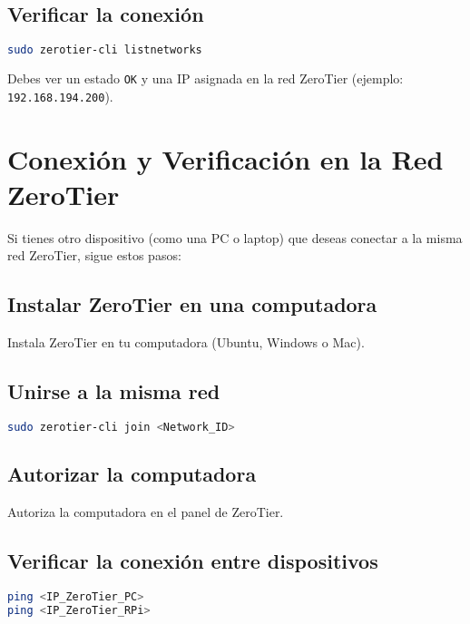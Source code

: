 \subsection{Verificar la conexión}
\begin{lstlisting}[language=bash]
sudo zerotier-cli listnetworks
\end{lstlisting}
Debes ver un estado \texttt{OK} y una IP asignada en la red ZeroTier (ejemplo: \texttt{192.168.194.200}).


\section{Conexión y Verificación en la Red ZeroTier}
Si tienes otro dispositivo (como una PC o laptop) que deseas conectar a la misma red ZeroTier, sigue estos pasos:

\subsection{Instalar ZeroTier en una computadora}
Instala ZeroTier en tu computadora (Ubuntu, Windows o Mac).

\subsection{Unirse a la misma red}
\begin{lstlisting}[language=bash]
sudo zerotier-cli join <Network_ID>
\end{lstlisting}

\subsection{Autorizar la computadora}
Autoriza la computadora en el panel de ZeroTier.

\subsection{Verificar la conexión entre dispositivos}
\begin{lstlisting}[language=bash]
ping <IP_ZeroTier_PC>
ping <IP_ZeroTier_RPi>
\end{lstlisting}



